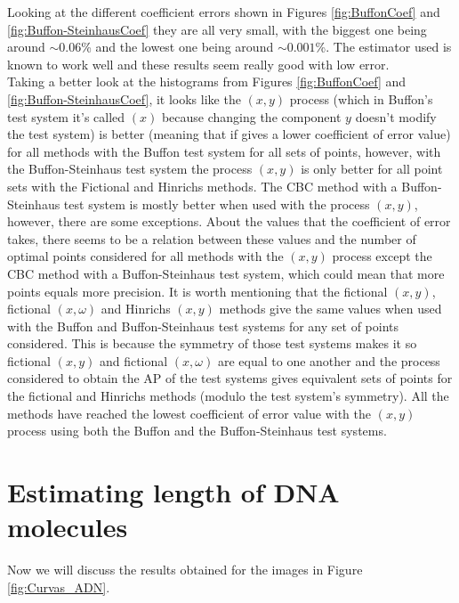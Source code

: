 

Looking at the different coefficient errors shown in Figures \ref{fig:BuffonCoef} and \ref{fig:Buffon-SteinhausCoef} they are all very small, with the biggest one being around $\sim 0.06$\% and the lowest one being around $\sim 0.001$\%. The estimator used is known to work well and these results seem really good with low error.\\


Taking a better look at the histograms from Figures \ref{fig:BuffonCoef} and \ref{fig:Buffon-SteinhausCoef}, it looks like the $(x,y)$ process (which in Buffon's test system it's called $(x)$ because changing the component $y$ doesn't modify the test system) is better (meaning that if gives a lower coefficient of error value) for all methods with the Buffon test system for all sets of points, however, with the Buffon-Steinhaus test system the process $(x,y)$ is only better for all point sets with the Fictional and Hinrichs methods. The CBC method with a Buffon-Steinhaus test system is mostly better when used with the process $(x,y)$, however, there are some exceptions. About the values that the coefficient of error takes, there seems to be a relation between these values and the number of optimal points considered for all methods with the $(x,y)$ process except the CBC method with a Buffon-Steinhaus test system, which could mean that more points equals more precision. It is worth mentioning that the fictional $(x,y)$, fictional $(x,\omega)$ and Hinrichs $(x,y)$ methods give the same values when used with the Buffon and Buffon-Steinhaus test systems for any set of points considered. This is because the symmetry of those test systems makes it so fictional $(x,y)$ and fictional $(x,\omega)$ are equal to one another and the process considered to obtain the AP of the test systems gives equivalent sets of points for the fictional and Hinrichs methods (modulo the test system's symmetry). All the methods have reached the lowest coefficient of error value with the $(x,y)$ process using both the Buffon and the Buffon-Steinhaus test systems.\\









\section{Estimating length of DNA molecules}
Now we will discuss the results obtained for the images in Figure \ref{fig:Curvas_ADN}. 

